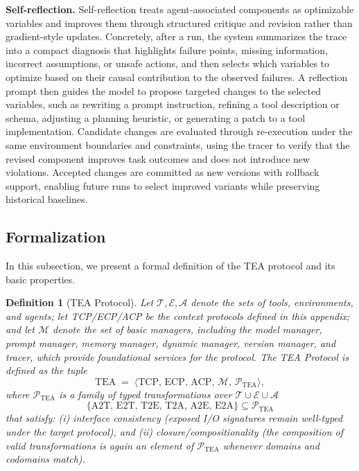 \documentclass[11pt]{article}
\newtheorem{definition}{Definition}
\begin{document}
\textbf{Self-reflection.} Self-reflection treats agent-associated components as optimizable variables and improves them through structured critique and revision rather than gradient-style updates. Concretely, after a run, the system summarizes the trace into a compact diagnosis that highlights failure points, missing information, incorrect assumptions, or unsafe actions, and then selects which variables to optimize based on their causal contribution to the observed failures. A reflection prompt then guides the model to propose targeted changes to the selected variables, such as rewriting a prompt instruction, refining a tool description or schema, adjusting a planning heuristic, or generating a patch to a tool implementation. Candidate changes are evaluated through re-execution under the same environment boundaries and constraints, using the tracer to verify that the revised component improves task outcomes and does not introduce new violations. Accepted changes are committed as new versions with rollback support, enabling future runs to select improved variants while preserving historical baselines.

\subsection{Formalization}
In this subsection, we present a formal definition of the TEA protocol and its basic properties.

\begin{definition}[TEA Protocol]
Let $\mathcal{T},\mathcal{E},\mathcal{A}$ denote the sets of tools, environments, and agents; let TCP/ECP/ACP be the context protocols defined in this appendix; and let $\mathcal{M}$ denote the set of basic managers, including the model manager, prompt manager, memory manager, dynamic manager, version manager, and tracer, which provide foundational services for the protocol. The TEA Protocol is defined as the tuple
\[ \mathrm{TEA} \;=\; \langle \mathrm{TCP},\, \mathrm{ECP},\, \mathrm{ACP},\, \mathcal{M},\, \mathcal{P}_{\mathrm{TEA}} \rangle, \]
where $\mathcal{P}_{\mathrm{TEA}}$ is a family of typed transformations over $\mathcal{T}\cup\mathcal{E}\cup\mathcal{A}$
\[ \{\mathrm{A2T},\,\mathrm{E2T},\,\mathrm{T2E},\,\mathrm{T2A},\,\mathrm{A2E},\,\mathrm{E2A}\} \subseteq \mathcal{P}_{\mathrm{TEA}} \]
that satisfy: (i) \textit{interface consistency} (exposed I/O signatures remain well-typed under the target protocol), and (ii) \textit{closure/compositionality} (the composition of valid transformations is again an element of $\mathcal{P}_{\mathrm{TEA}}$ whenever domains and codomains match).
\end{definition}
\end{document}
